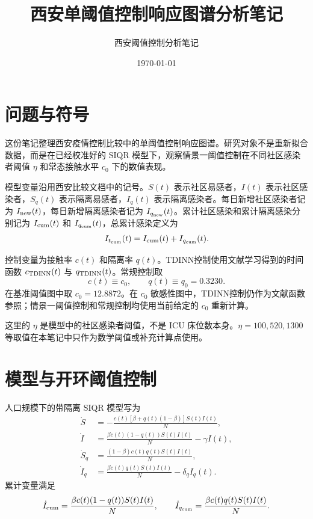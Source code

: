 \documentclass[cn,blue,14pt,normal]{elegantnote}
\title{西安单阈值控制响应图谱分析笔记}
\author{西安阈值控制分析笔记}
\institute{SIQR 模型与医疗阈值控制}
\date{\today}
\numberwithin{equation}{section}
\newcommand{\Itcum}{I_{t_{\rm cum}}}
\begin{document}
\maketitle

\section{问题与符号}

这份笔记整理西安疫情控制比较中的单阈值控制响应图谱。研究对象不是重新拟合数据，而是在已经校准好的 SIQR 模型下，观察情景一阈值控制在不同社区感染者阈值 $\eta$ 和常态接触水平 $c_0$ 下的数值表现。

模型变量沿用西安比较文档中的记号。$S(t)$ 表示社区易感者，$I(t)$ 表示社区感染者，$S_q(t)$ 表示隔离易感者，$I_q(t)$ 表示隔离感染者。每日新增社区感染者记为 $I_{\rm new}(t)$，每日新增隔离感染者记为 $I_{q_{\rm new}}(t)$。累计社区感染和累计隔离感染分别记为 $I_{\rm cum}(t)$ 和 $I_{q_{\rm cum}}(t)$，总累计感染定义为
\begin{equation}
  \Itcum(t)=I_{\rm cum}(t)+I_{q_{\rm cum}}(t).
\end{equation}

控制变量为接触率 $c(t)$ 和隔离率 $q(t)$。TDINN控制使用文献学习得到的时间函数 $c_{\rm TDINN}(t)$ 与 $q_{\rm TDINN}(t)$。常规控制取
\begin{equation}
  c(t)\equiv c_0,\qquad q(t)\equiv q_0=0.3230.
\end{equation}
在基准阈值图中取 $c_0=12.8872$。在 $c_0$ 敏感性图中，TDINN控制仍作为文献函数参照；情景一阈值控制和常规控制均使用当前给定的 $c_0$ 重新计算。

\begin{note}
  这里的 $\eta$ 是模型中的社区感染者阈值，不是 ICU 床位数本身。$\eta=100,520,1300$ 等取值在本笔记中只作为数学阈值或补充计算点使用。
\end{note}

\section{模型与开环阈值控制}

人口规模下的带隔离 SIQR 模型写为
\begin{align}
  \dot S
  &=
  -\frac{c(t)[\beta+q(t)(1-\beta)]S(t)I(t)}{N},\\
  \dot I
  &=
  \frac{\beta c(t)(1-q(t))S(t)I(t)}{N}-\gamma I(t),\\
  \dot S_q
  &=
  \frac{(1-\beta)c(t)q(t)S(t)I(t)}{N},\\
  \dot I_q
  &=
  \frac{\beta c(t)q(t)S(t)I(t)}{N}-\delta_q I_q(t).
\end{align}
累计变量满足
\begin{equation}
  \dot I_{\rm cum}
  =
  \frac{\beta c(t)(1-q(t))S(t)I(t)}{N},
  \qquad
  \dot I_{q_{\rm cum}}
  =
  \frac{\beta c(t)q(t)S(t)I(t)}{N}.
\end{equation}
\end{document}
